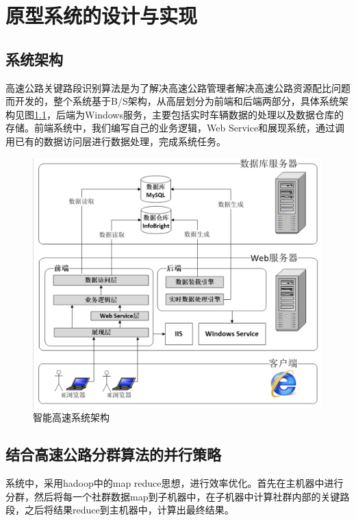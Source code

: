 
\chapter{原型系统的设计与实现}
	\section{系统架构}
		高速公路关键路段识别算法是为了解决高速公路管理者解决高速公路资源配比问题而开发的，整个系统基于B/S架构，从高层划分为前端和后端两部分，具体系统架构见图\ref{fig20}，后端为Windows服务，主要包括实时车辆数据的处理以及数据仓库的存储。前端系统中，我们编写自己的业务逻辑，Web Service和展现系统，通过调用已有的数据访问层进行数据处理，完成系统任务。

		\begin{figure}[h]
		\centering
				\begin{minipage}{0.8\linewidth}
					\centering
					\includegraphics[width=4.4in]{picture/jiagou}
					\caption{智能高速系统架构}
					\label{fig20}
				\end{minipage}%
		\end{figure}
	\section{结合高速公路分群算法的并行策略}
		系统中，采用hadoop中的map reduce思想，进行效率优化。首先在主机器中进行分群，然后将每一个社群数据map到子机器中，在子机器中计算社群内部的关键路段，之后将结果reduce到主机器中，计算出最终结果。

